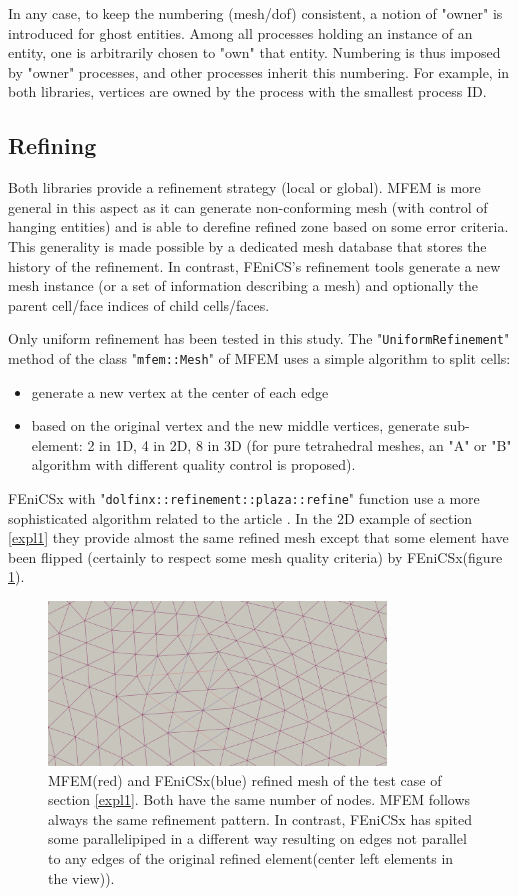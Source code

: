 \documentclass[12pt]{article}
\newcommand{\f}[1]{FEniCSx#1}
\newcommand{\mycode}[1]{\textsf{"}\lstinline`#1`\textsf{"}}
\begin{document}
In any case, to keep the numbering (mesh/dof) consistent, a notion of "owner" is introduced for ghost entities. Among all processes holding an instance of an entity, one is arbitrarily chosen to "own" that entity. Numbering is thus imposed by "owner" processes, and other processes inherit this numbering. For example, in both libraries, vertices are owned by the process with the smallest process ID.

\subsection{Refining} 
 
Both libraries provide a refinement strategy (local or global). MFEM is more general in this aspect as it can generate non-conforming mesh (with control of hanging entities) and is able to derefine refined zone based on some error criteria.
This generality is made possible by a dedicated mesh database that stores the history of the refinement. In contrast, FEniCS's refinement tools generate a new mesh instance (or a set of information describing a mesh) and optionally the parent cell/face indices of child cells/faces.  
 
Only uniform refinement has been tested in this study.
The \mycode{UniformRefinement} method of the class \mycode{mfem::Mesh} of MFEM uses a simple algorithm to split cells:
\begin{itemize}
	\item generate a new vertex at the center of each edge
	\item based on the original vertex and the new middle vertices, generate sub-element: 2 in 1D, 4 in 2D, 8 in 3D (for pure tetrahedral meshes, an "A" or "B" algorithm with different quality control is proposed). 
\end{itemize}

\f{} with \mycode{dolfinx::refinement::plaza::refine} function use a more sophisticated algorithm related to the article \cite{PLAZA2000195}. In the 2D example of section \ref{expl1}
they provide almost the same refined mesh except that some element have been flipped (certainly to respect some mesh quality criteria) by \f{}(figure \ref{element_swap}).
 \begin{figure}
	\centering
	\includegraphics[width=0.8\textwidth]{ref2_mesh_difference.png}
	\caption{MFEM(red) and \f{}(blue) refined mesh of the test case of section \ref{expl1}. Both have the same number of nodes. MFEM follows always the same refinement pattern. In contrast, \f{} has spited some parallelipiped in a different way resulting on edges not parallel to any edges of the original refined element(center left elements in the view)).  \label{element_swap}}
\end{figure}
\end{document}
